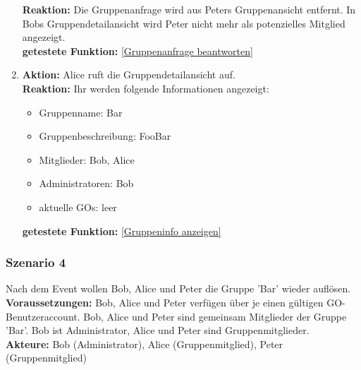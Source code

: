 \documentclass[parskip=full]{scrartcl}
\def\threedigits#1{%
  \ifnum#1<100 0\fi
  \ifnum#1<10 0\fi
  \number#1}
\begin{document}
\begin{enumerate}[label={\textbf{/T\protect\threedigits{\theenumi}0/}}, leftmargin=*, resume]
	\textbf{Reaktion:} Die Gruppenanfrage wird aus Peters Gruppenansicht entfernt. In Bobs Gruppendetailansicht wird Peter nicht mehr als potenzielles Mitglied angezeigt.\\
	\textbf{getestete Funktion: }\ref{Gruppenanfrage beantworten}
	\item \textbf{Aktion:} Alice ruft die Gruppendetailansicht auf.\\
	\textbf{Reaktion:} Ihr werden folgende Informationen angezeigt:
	\begin{itemize}
		\item Gruppenname: Bar
		\item Gruppenbeschreibung: FooBar
		\item Mitglieder: Bob, Alice
		\item Administratoren: Bob
		\item aktuelle GOs: leer
	\end{itemize}
	\textbf{getestete Funktion: }\ref{Gruppeninfo anzeigen}
\end{enumerate}

\subsubsection*{Szenario 4}Nach dem Event wollen Bob, Alice und Peter die Gruppe 'Bar' wieder auflösen.\\

\textbf{Voraussetzungen: }Bob, Alice und Peter verfügen über je einen gültigen GO-Benutzeraccount. Bob, Alice und Peter sind gemeinsam Mitglieder der Gruppe 'Bar'. Bob ist Administrator, Alice und Peter sind Gruppenmitglieder.\\

\textbf{Akteure:} Bob (Administrator), Alice (Gruppenmitglied), Peter (Gruppenmitglied) \\
\end{document}
